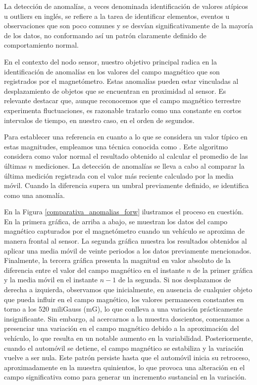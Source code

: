 

\label{detector_anomalias}
La detección de anomalías, a veces denominada identificación de valores atípicos u outliers en inglés, se refiere a la tarea de identificar elementos, eventos u observaciones que son poco comunes y se desvían significativamente de la mayoría de los datos, no conformando así un patrón claramente definido de comportamiento normal.

En el contexto del nodo sensor, nuestro objetivo principal radica en la identificación de anomalías en los valores del campo magnético que son registrados por el magnetómetro. Estas anomalías pueden estar vinculadas al desplazamiento de objetos que se encuentran en proximidad al sensor. Es relevante destacar que, aunque reconocemos que el campo magnético terrestre experimenta fluctuaciones, es razonable tratarlo como una constante en cortos intervalos de tiempo, en nuestro caso, en el orden de segundos.

Para establecer una referencia en cuanto a lo que se considera un valor típico en estas magnitudes, empleamos una técnica conocida como . Este algoritmo considera como valor normal el resultado obtenido al calcular el promedio de las últimas $n$ mediciones. La detección de anomalías se lleva a cabo al comparar la última medición registrada con el valor más reciente calculado por la media móvil. Cuando la diferencia supera un umbral previamente definido, se identifica como una anomalía.

En la Figura \ref{comparativa_anomalias_forw} ilustramos el proceso en cuestión. En la primera gráfica, de arriba a abajo, se muestran los datos del campo magnético capturados por el magnetómetro cuando un vehículo se aproxima de manera frontal al sensor. La segunda gráfica muestra los resultados obtenidos al aplicar una media móvil de veinte periodos a los datos previamente mencionados. Finalmente, la tercera gráfica presenta la magnitud en valor absoluto de la diferencia entre el valor del campo magnético en el instante $n$ de la primer gráfica y la media móvil en el instante $n-1$ de la segunda.
Si nos desplazamos de derecha a izquierda, observamos que inicialmente, en ausencia de cualquier objeto que pueda influir en el campo magnético, los valores permanecen constantes en torno a los 520 miliGauss (mG), lo que conlleva a una variación prácticamente insignificante. Sin embargo, al acercarnos a la muestra doscientos, comenzamos a presenciar una variación en el campo magnético debido a la aproximación del vehículo, lo que resulta en un notable aumento en la variabilidad. Posteriormente, cuando el automóvil se detiene, el campo magnético se estabiliza y la variación vuelve a ser nula. Este patrón persiste hasta que el automóvil inicia su retroceso, aproximadamente en la muestra quinientos, lo que provoca una alteración en el campo significativa como para generar un incremento sustancial en la variación.

